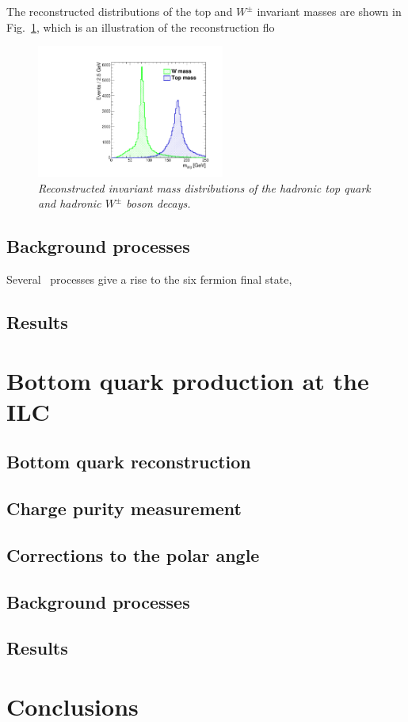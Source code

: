 The reconstructed distributions of the top and $W^\pm$ invariant masses are shown in Fig.~\ref{fig:TopWmass_3}, which is an illustration of the reconstruction flo

\begin{figure}[h]
	{\centering
		\includegraphics[width=0.55\textwidth]{ILD/plots/top-w-mass.pdf}
		\caption{\sl Reconstructed invariant mass distributions of the hadronic top quark and hadronic $W^\pm$ boson decays.
		}
		\label{fig:TopWmass_3}
	}
	
\end{figure}

\subsection{Background processes}
Several \sm\ processes give a rise to the six fermion final state, 

\subsection{Results}


\section{Bottom quark production at the ILC}

\subsection{Bottom quark reconstruction}
\subsection{Charge purity measurement}
\label{sec:ChargePurity}
\subsection{Corrections to the polar angle}
\subsection{Background processes}
\subsection{Results}

\section*{Conclusions}
